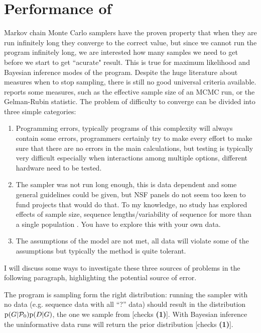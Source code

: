 \chapter{Performance of  \migrate}

Markov chain Monte Carlo samplers have the proven property that when they are run infinitely long they converge to the correct value, but since we cannot run the program infinitely long, we are interested how many samples we need to get before we start to get ``acurate" result.  This is true for maximum likelihood and Bayesian inference modes of the program.
Despite the huge literature about measures when to stop sampling, there
is still no good universal criteria available. \migrate reports some measures, such as the effective sample size of an MCMC run, or the Gelman-Rubin statistic. The problem of difficulty to converge can be divided into three simple categories: 
\begin{enumerate}
\item Programming errors, typically programs of this complexity will always contain some errors, programmers certainly try to make every effort to make sure that there are no errors in the main calculations, but testing is typically very difficult especially when interactions among multiple options, different hardware need to be tested. 
\item The sampler was not run long enough, this is data dependent and some general guidelines could be given, 
but NSF panels do not seem too keen to fund projects that would do that. To my knowledge, no study has explored effects of sample size, sequence lengths/variability of sequence for more than a single population \citep{Pluzhnikov:1996, Felsenstein:2005, Carling:2007}. You have to explore this with your own data.
\item The assumptions of the model are not met, all data will violate some of the assumptions but typically the method is quite tolerant.
\end{enumerate}
I will discuss some ways to investigate these three sources of problems in the following paragraph, highlighting the potential source of error.

The program is sampling form the right distribution: 
running the sampler with no data (e.g. sequence data with all ``?'' data)
should result
in the distribution ${\rm p}(G|\mathcal{P}_0){\rm p}(D|G)$, the one 
we sample from [checks {\bf (1)}]. With Bayesian inference the uninformative data runs will return the prior distribution [checks {\bf (1)}]. 

